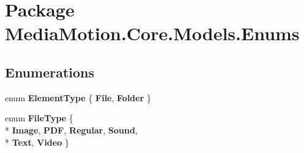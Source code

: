 \hypertarget{namespace_media_motion_1_1_core_1_1_models_1_1_enums}{\section{Package Media\+Motion.\+Core.\+Models.\+Enums}
\label{namespace_media_motion_1_1_core_1_1_models_1_1_enums}
}
\subsection*{Enumerations}
\begin{DoxyCompactItemize}
\item 
\hypertarget{namespace_media_motion_1_1_core_1_1_models_1_1_enums_a25bb9bd1846ea36ef85f58fff324936d}{enum {\bfseries Element\+Type} \{ {\bfseries File}, 
{\bfseries Folder}
 \}}\label{namespace_media_motion_1_1_core_1_1_models_1_1_enums_a25bb9bd1846ea36ef85f58fff324936d}

\item 
\hypertarget{namespace_media_motion_1_1_core_1_1_models_1_1_enums_a949bb1f9b30b92c830b001d255e22bf8}{enum {\bfseries File\+Type} \{ \\*
{\bfseries Image}, 
{\bfseries P\+D\+F}, 
{\bfseries Regular}, 
{\bfseries Sound}, 
\\*
{\bfseries Text}, 
{\bfseries Video}
 \}}\label{namespace_media_motion_1_1_core_1_1_models_1_1_enums_a949bb1f9b30b92c830b001d255e22bf8}

\end{DoxyCompactItemize}
